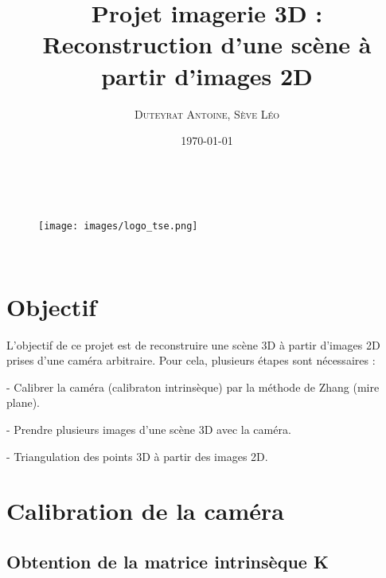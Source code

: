 \documentclass[12pt]{article}
\title{\textbf{Projet imagerie 3D : Reconstruction d'une scène à partir d'images 2D}}
\author{
    \textsc{Duteyrat Antoine},
    \textsc{Sève Léo}
}
\date{\today}
\makeatletter
\let\titre\@title %
\let\auteurs\@author %
\let\date\@date %
\makeatother
\begin{document}
\begin{titlepage}
    \begin{center}
        \vskip 1.5cm
        {\color {couleur}{\huge \bf \titre}}\\[5mm] %
        \vskip 0.5cm
        \begin{figure}[h]
        \centering
        \texttt{[image: images/logo\_tse.png]}
        \end{figure}
        \vskip 1cm %
        {\large \auteurs}\\ %
        \vskip 0.5cm %
        \vfill
        \vskip 0.2cm
        \date %
      \end{center}
\end{titlepage}
\clearpage

\tableofcontents

\newpage

\section{Objectif}

L'objectif de ce projet est de reconstruire une scène 3D à partir d'images 2D prises d'une caméra arbitraire.
Pour cela, plusieurs étapes sont nécessaires :

- Calibrer la caméra (calibraton intrinsèque) par la méthode de Zhang (mire plane).

- Prendre plusieurs images d'une scène 3D avec la caméra.

- Triangulation des points 3D à partir des images 2D.

\newpage

\section{Calibration de la caméra}

\subsection{Obtention de la matrice intrinsèque K}
\end{document}
